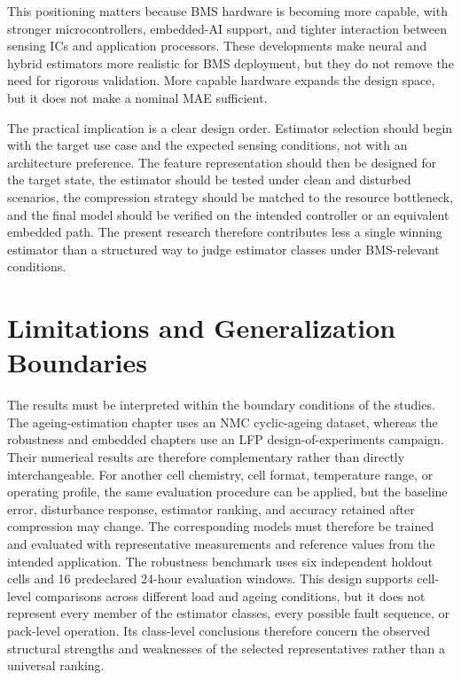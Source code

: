 \documentclass[
    a4paper,
    12pt,
    titlepage,
    bibliography=totoc,
    twoside=on,
    parskip=false,
    numbers=noenddot,
    cleardoublepage=empty,
    DIV=12,
    BCOR=12.0mm,
    headheight=36pt,
    headings=openright
]{scrreprt}
\begin{document}
This positioning matters because BMS hardware is becoming more capable, with stronger microcontrollers, embedded-AI support, and tighter interaction between sensing ICs and application processors. These developments make neural and hybrid estimators more realistic for BMS deployment, but they do not remove the need for rigorous validation. More capable hardware expands the design space, but it does not make a nominal MAE sufficient.

The practical implication is a clear design order. Estimator selection should begin with the target use case and the expected sensing conditions, not with an architecture preference. The feature representation should then be designed for the target state, the estimator should be tested under clean and disturbed scenarios, the compression strategy should be matched to the resource bottleneck, and the final model should be verified on the intended controller or an equivalent embedded path. The present research therefore contributes less a single winning estimator than a structured way to judge estimator classes under BMS-relevant conditions.

\section{Limitations and Generalization Boundaries}
\label{sec:overall_limitations}
The results must be interpreted within the boundary conditions of the studies. The ageing-estimation chapter uses an NMC cyclic-ageing dataset, whereas the robustness and embedded chapters use an LFP design-of-experiments campaign. Their numerical results are therefore complementary rather than directly interchangeable. For another cell chemistry, cell format, temperature range, or operating profile, the same evaluation procedure can be applied, but the baseline error, disturbance response, estimator ranking, and accuracy retained after compression may change. The corresponding models must therefore be trained and evaluated with representative measurements and reference values from the intended application. The robustness benchmark uses six independent holdout cells and 16 predeclared 24-hour evaluation windows. This design supports cell-level comparisons across different load and ageing conditions, but it does not represent every member of the estimator classes, every possible fault sequence, or pack-level operation. Its class-level conclusions therefore concern the observed structural strengths and weaknesses of the selected representatives rather than a universal ranking.
\end{document}
